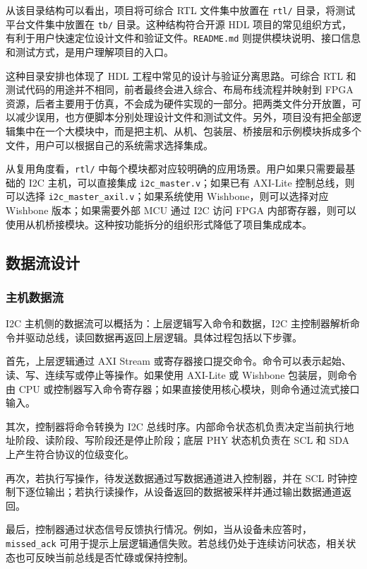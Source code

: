 \documentclass[12pt,a4paper]{article}
\numberwithin{equation}{section}
\begin{document}
从该目录结构可以看出，项目将可综合 RTL 文件集中放置在 \texttt{rtl/} 目录，将测试平台文件集中放置在 \texttt{tb/} 目录。这种结构符合开源 HDL 项目的常见组织方式，有利于用户快速定位设计文件和验证文件。\texttt{README.md} 则提供模块说明、接口信息和测试方式，是用户理解项目的入口。

这种目录安排也体现了 HDL 工程中常见的设计与验证分离思路。可综合 RTL 和测试代码的用途并不相同，前者最终会进入综合、布局布线流程并映射到 FPGA 资源，后者主要用于仿真，不会成为硬件实现的一部分。把两类文件分开放置，可以减少误用，也方便脚本分别处理设计文件和测试文件。另外，项目没有把全部逻辑集中在一个大模块中，而是把主机、从机、包装层、桥接层和示例模块拆成多个文件，用户可以根据自己的系统需求选择集成。

从复用角度看，\texttt{rtl/} 中每个模块都对应较明确的应用场景。用户如果只需要最基础的 I2C 主机，可以直接集成 \texttt{i2c\_master.v}；如果已有 AXI-Lite 控制总线，则可以选择 \texttt{i2c\_master\_axil.v}；如果系统使用 Wishbone，则可以选择对应 Wishbone 版本；如果需要外部 MCU 通过 I2C 访问 FPGA 内部寄存器，则可以使用从机桥接模块。这种按功能拆分的组织形式降低了项目集成成本。

\subsection{数据流设计}

\subsubsection{主机数据流}

I2C 主机侧的数据流可以概括为：上层逻辑写入命令和数据，I2C 主控制器解析命令并驱动总线，读回数据再返回上层逻辑。具体过程包括以下步骤。

首先，上层逻辑通过 AXI Stream 或寄存器接口提交命令。命令可以表示起始、读、写、连续写或停止等操作。如果使用 AXI-Lite 或 Wishbone 包装层，则命令由 CPU 或控制器写入命令寄存器；如果直接使用核心模块，则命令通过流式接口输入。

其次，控制器将命令转换为 I2C 总线时序。内部命令状态机负责决定当前执行地址阶段、读阶段、写阶段还是停止阶段；底层 PHY 状态机负责在 SCL 和 SDA 上产生符合协议的位级变化。

再次，若执行写操作，待发送数据通过写数据通道进入控制器，并在 SCL 时钟控制下逐位输出；若执行读操作，从设备返回的数据被采样并通过输出数据通道返回。

最后，控制器通过状态信号反馈执行情况。例如，当从设备未应答时，\texttt{missed\_ack} 可用于提示上层逻辑通信失败。若总线仍处于连续访问状态，相关状态也可反映当前总线是否忙碌或保持控制。
\end{document}
